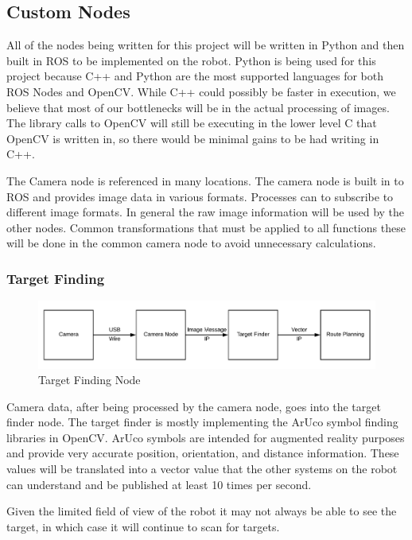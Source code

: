 \documentclass{article}
\begin{document}
	\subsection{Custom Nodes}
	
	 All of the nodes being written for this project will be written in Python and then built in ROS to be implemented on the robot. Python is being used for this project because C++ and Python are the most supported languages for both ROS Nodes and OpenCV. While C++ could possibly be faster in execution, we believe that most of our bottlenecks will be in the actual processing of images. The library calls to OpenCV will still be executing in the lower level C that OpenCV is written in, so there would be minimal gains to be had writing in C++.
	 
	 The Camera node is referenced in many locations. The camera node is built in to ROS and provides image data in various formats. Processes can to subscribe to different image formats. In general the raw image information will be used by the other nodes. Common transformations that must be applied to all functions these will be done in the common camera node to avoid unnecessary calculations.
	
	\subsubsection{Target Finding}
	
	\begin{figure}[H]
		\centering
		\includegraphics[width=0.9\linewidth]{Camera-Target-Route}
		\caption{Target Finding Node}
		\label{fig:target}
	\end{figure}

	Camera data, after being processed by the camera node, goes into the target finder node. The target finder is mostly implementing the ArUco symbol finding libraries in OpenCV. ArUco symbols are intended for augmented reality purposes and provide very accurate position, orientation, and distance information. These values will be translated into a vector value that the other systems on the robot can understand and be published at least 10 times per second.
	
	Given the limited field of view of the robot it may not always be able to see the target, in which case it will continue to scan for targets.
	
\end{document}
